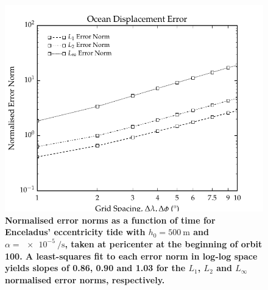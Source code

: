 \begin{figure}[t]
\centering
\includegraphics[width=0.6\linewidth]{Figures/convergence_eta}
\caption{\textbf{Normalised error norms as a function of time for Enceladus' eccentricity tide with $h_0 = \SI{500}{\metre}$ and $\alpha = \SI{e-5}{\per\second}$, taken at pericenter at the beginning of orbit \num{100}. A least-squares fit to each error norm in log-log space yields slopes of \num{0.86}, \num{0.90} and \num{1.03} for the $L_1$, $L_2$ and $L_{\infty}$ normalised error norms, respectively.} \label{fig:spatial_convergence}}
\end{figure}



